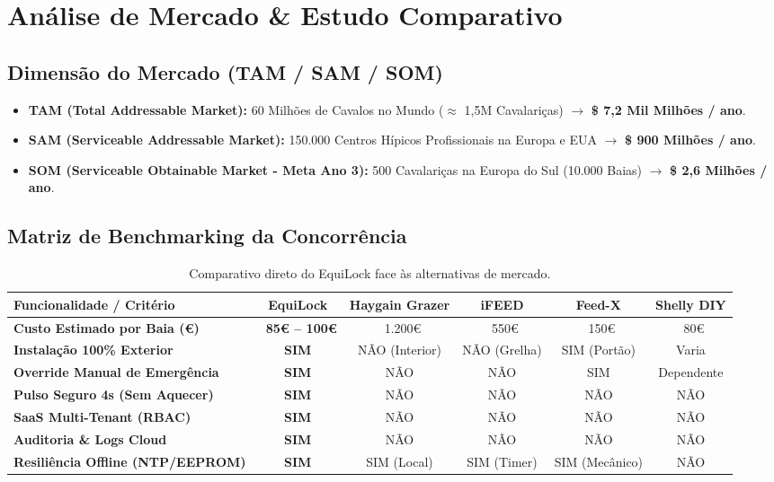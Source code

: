 \documentclass[11pt,a4paper]{article}
\begin{document}
\section{Análise de Mercado \& Estudo Comparativo}

\subsection{Dimensão do Mercado (TAM / SAM / SOM)}
\begin{itemize}[leftmargin=*]
    \item \textbf{TAM (Total Addressable Market):} 60 Milhões de Cavalos no Mundo ($\approx$ 1,5M Cavalariças) $\rightarrow$ \textbf{\$ 7,2 Mil Milhões / ano}.
    \item \textbf{SAM (Serviceable Addressable Market):} 150.000 Centros Hípicos Profissionais na Europa e EUA $\rightarrow$ \textbf{\$ 900 Milhões / ano}.
    \item \textbf{SOM (Serviceable Obtainable Market - Meta Ano 3):} 500 Cavalariças na Europa do Sul (10.000 Baias) $\rightarrow$ \textbf{\$ 2,6 Milhões / ano}.
\end{itemize}

\subsection{Matriz de Benchmarking da Concorrência}

\begin{table}[h!]
\centering
\scriptsize
\renewcommand{\arraystretch}{1.3}
\begin{tabularx}{\textwidth}{|X|c|c|c|c|c|}
\hline
\rowcolor{primary!10} \textbf{Funcionalidade / Critério} & \textbf{EquiLock} & \textbf{Haygain Grazer} & \textbf{iFEED} & \textbf{Feed-X} & \textbf{Shelly DIY} \\ \hline
\textbf{Custo Estimado por Baia (€)} & \textbf{~85€ -- 100€} & ~1.200€ & ~550€ & ~150€ & ~80€ \\ \hline
\textbf{Instalação 100\% Exterior} & \textbf{SIM} & NÃO (Interior) & NÃO (Grelha) & SIM (Portão) & Varia \\ \hline
\textbf{Override Manual de Emergência} & \textbf{SIM} & NÃO & NÃO & SIM & Dependente \\ \hline
\textbf{Pulso Seguro 4s (Sem Aquecer)} & \textbf{SIM} & NÃO & NÃO & NÃO & NÃO \\ \hline
\textbf{SaaS Multi-Tenant (RBAC)} & \textbf{SIM} & NÃO & NÃO & NÃO & NÃO \\ \hline
\textbf{Auditoria \& Logs Cloud} & \textbf{SIM} & NÃO & NÃO & NÃO & NÃO \\ \hline
\textbf{Resiliência Offline (NTP/EEPROM)} & \textbf{SIM} & SIM (Local) & SIM (Timer) & SIM (Mecânico) & NÃO \\ \hline
\end{tabularx}
\caption{Comparativo direto do EquiLock face às alternativas de mercado.}
\end{table}
\end{document}
